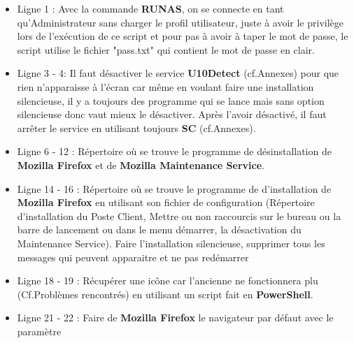 \documentclass[11pt,a4paper,oneside]{article}
\begin{document}
\begin{itemize}
	\item Ligne 1 : Avec la commande \textbf{RUNAS}, on se connecte en tant qu'Administrateur sans charger le profil utilisateur, juste à avoir le privilège lors de l'exécution de ce script et pour pas à avoir à taper le mot de passe, le script utilise le fichier "pass.txt" qui contient le mot de passe en clair.
	\item Ligne 3 - 4: Il faut désactiver le service \textbf{U10Detect} (cf.Annexes) pour que rien n'apparaisse à l'écran car  même en voulant faire une installation silencieuse, il y a toujours des programme qui se lance mais sans option silencieuse donc vaut mieux le désactiver. Après l'avoir désactivé, il faut arrêter le service en utilisant toujours \textbf{SC} (cf.Annexes). 
	\item Ligne 6 - 12 : Répertoire où se trouve le programme de désinstallation de \textbf{Mozilla Firefox} et de \textbf{Mozilla Maintenance Service}.
	\item Ligne 14 - 16 : Répertoire où se trouve le programme de d'installation de \textbf{Mozilla Firefox} en utilisant son fichier de configuration (Répertoire d'installation du Poste Client, Mettre ou non raccourcis sur le bureau ou la barre de lancement ou dans le menu démarrer, la désactivation du Maintenance Service). Faire l'installation silencieuse, supprimer tous les messages qui peuvent apparaitre et ne pas redémarrer
	\item Ligne 18 - 19 : Récupérer une icône car l'ancienne ne fonctionnera plu (Cf.Problèmes rencontrés) en utilisant un script fait en \textbf{PowerShell}.
	\item Ligne 21 - 22 : Faire de \textbf{Mozilla Firefox} le navigateur par défaut avec le paramètre
\end{itemize}
\newpage
\end{document}
